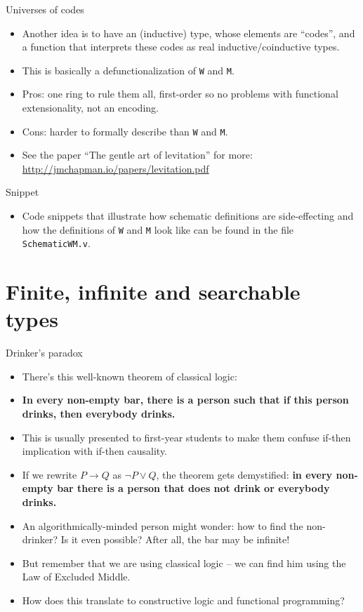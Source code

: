 \documentclass{beamer}
\begin{document}
\begin{frame}{Universes of codes}
\begin{itemize}
	\item Another idea is to have an (inductive) type, whose elements are ``codes'', and a function that interprets these codes as real inductive/coinductive types.
	\item This is basically a defunctionalization of \texttt{W} and \texttt{M}.
	\item Pros: one ring to rule them all, first-order so no problems with functional extensionality, not an encoding.
	\item Cons: harder to formally describe than \texttt{W} and \texttt{M}.
	\item See the paper ``The gentle art of levitation'' for more: \url{http://jmchapman.io/papers/levitation.pdf}
\end{itemize}
\end{frame}

\begin{frame}{Snippet}
\begin{itemize}
	\item Code snippets that illustrate how schematic definitions are side-effecting and how the definitions of \texttt{W} and \texttt{M} look like can be found in the file \texttt{SchematicWM.v}.
\end{itemize}
\end{frame}

\section{Finite, infinite and searchable types}

\begin{frame}{Drinker's paradox}
\begin{itemize}
	\item There's this well-known theorem of classical logic:
	\item \textbf{In every non-empty bar, there is a person such that if this person drinks, then everybody drinks.}
	\item This is usually presented to first-year students to make them confuse if-then implication with if-then causality.
	\item If we rewrite $P \to Q$ as $\neg P \lor Q$, the theorem gets demystified: \textbf{in every non-empty bar there is a person that does not drink or everybody drinks.}
	\item An algorithmically-minded person might wonder: how to find the non-drinker? Is it even possible? After all, the bar may be infinite!
	\item But remember that we are using classical logic -- we can find him using the Law of Excluded Middle.
	\item How does this translate to constructive logic and functional programming?
\end{itemize}
\end{frame}
\end{document}
